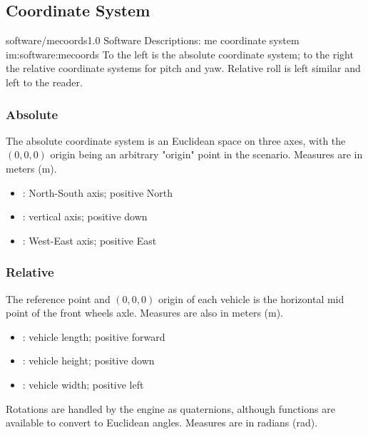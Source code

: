 \subsection{Coordinate System}

\begin{image}
	{software/mecoords}{1.0}
	{Software Descriptions: \gls{me} coordinate system}
	{im:software:mecoords}
	{}
	{To the left is the absolute coordinate system; to the right the relative coordinate systems for pitch and yaw. Relative roll is left similar and left to the reader.}
\end{image}

\subsubsection{Absolute}

The absolute coordinate system is an Euclidean space on three axes, with the $(0,0,0)$ origin being an arbitrary "origin" point in the scenario. Measures are in meters (\si{\meter}).

\begin{itemize}
	\item {}: North-South axis; positive North
	\item {}: vertical axis; positive down
	\item {}: West-East axis; positive East
\end{itemize}

\subsubsection{Relative}

The reference point and $(0,0,0)$ origin of each vehicle is the horizontal mid point of the front wheels axle. Measures are also in meters (\si{\meter}).

\begin{itemize}
	\item {}: vehicle length; positive forward
	\item {}: vehicle height; positive down
	\item {}: vehicle width; positive left
\end{itemize}

\FLOATnoindent Rotations are handled by the engine as quaternions, although functions are available to convert to Euclidean angles. Measures are in radians (\si{\radian}).

